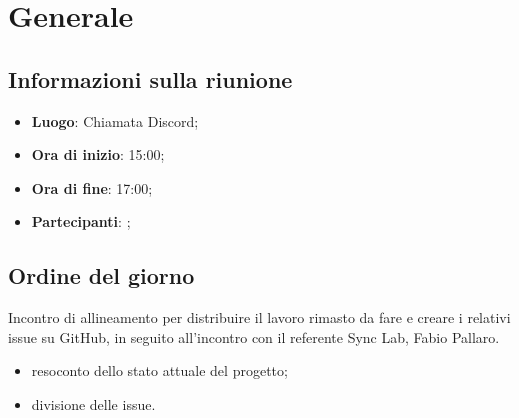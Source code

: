 \section{Generale}

\vspace{10pt}


\subsection{Informazioni sulla riunione}
\begin{itemize}
	\item \textbf{Luogo}: Chiamata Discord;
	\item \textbf{Ora di inizio}: 15:00;
	\item \textbf{Ora di fine}: 17:00;
	\item \textbf{Partecipanti}: \team;
\end{itemize}

\vspace{5pt}

\subsection{Ordine del giorno}
Incontro di allineamento per distribuire il lavoro rimasto da fare e creare i relativi issue su GitHub\glo, in seguito all'incontro con il referente Sync Lab, Fabio Pallaro.
\begin{itemize}
	\item resoconto dello stato attuale del progetto;
	\item divisione delle issue.
\end{itemize}
